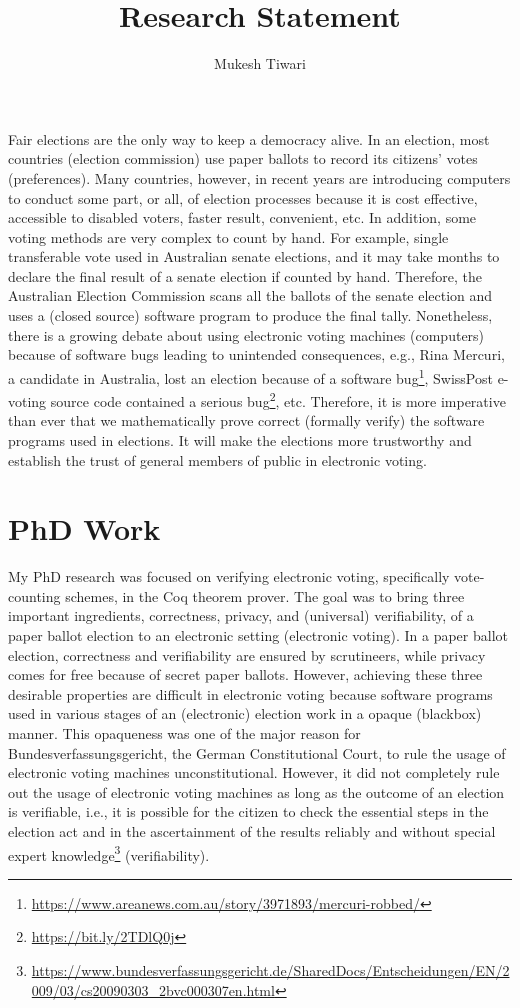 \documentclass[a4paper]{article}
\title{Research Statement}
\author{Mukesh Tiwari}
\date{}
\begin{document}
\fontsize{12}{15}
\selectfont
\maketitle

Fair elections are the only way to keep a democracy alive. In an election, most countries (election commission) use paper ballots to record 
its citizens' votes (preferences). Many countries, however, in recent years are introducing computers to conduct some part, or all, of 
election processes because it is cost effective, accessible to disabled voters, faster result, convenient, etc. 
In addition, some voting methods are very complex to count by hand. For example,
single transferable vote used in Australian senate elections, and it may take months to declare the final result of 
a senate election if 
counted by hand. Therefore, the Australian Election Commission scans all the ballots of the senate election and 
uses a (closed source) software program to produce the final tally. Nonetheless, there is a growing debate about using electronic voting machines (computers)
because of software bugs leading to unintended consequences, e.g., Rina Mercuri, 
a candidate in Australia, lost an election because of 
a software bug\footnote{\url{https://www.areanews.com.au/story/3971893/mercuri-robbed/}}, 
SwissPost e-voting source code contained a serious 
bug\footnote{\url{https://bit.ly/2TDlQ0j}}, etc.
Therefore, it is more imperative than ever  that  we mathematically prove correct (formally verify)  the software programs 
used in elections. It will make the elections more trustworthy and establish the trust of general members of public
in electronic voting.



\section{PhD Work}
My PhD research was focused on verifying electronic voting, specifically vote-counting schemes, in 
the Coq theorem prover. The goal was to 
bring  three important ingredients, correctness, privacy, and (universal) verifiability, of a paper ballot election to 
an electronic setting (electronic voting). In a paper ballot election, correctness and verifiability are
ensured by scrutineers, while privacy 
comes for free because of secret paper ballots.  However, achieving these three desirable properties 
are difficult in electronic voting because software programs used in 
various stages of an (electronic) election work in a opaque (blackbox) manner. This 
opaqueness was one of the major reason for Bundesverfassungsgericht, the German Constitutional Court, 
to rule the usage of electronic voting machines unconstitutional. However, it did not 
completely rule out the usage of electronic voting machines as long as the outcome of an election 
is verifiable, i.e., it is possible for the citizen to check the essential steps in the 
election act and in the ascertainment of the results reliably and without special 
expert knowledge\footnote{\url{https://www.bundesverfassungsgericht.de/SharedDocs/Entscheidungen/EN/2009/03/cs20090303_2bvc000307en.html}} (verifiability).
\end{document}
